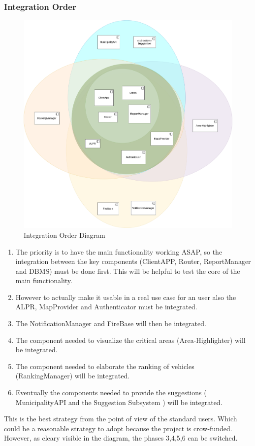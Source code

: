 \documentclass{article}
\begin{document}
\subsubsection{Integration Order}
		\begin{figure}[!htb]
			\centering
			\includegraphics[width=1.0\textwidth]{images/component-integration.png}
			\caption{Integration Order Diagram}
		\end{figure}
\begin{enumerate}
	\item 	The priority is to have the main functionality working ASAP, so the integration between the key components (ClientAPP, Router, ReportManager and DBMS) must be done first. 
		This will be helpful to test the core of the main functionality. 
	\item 	However to actually make it usable in a real use case for an user also the ALPR, MapProvider and Authenticator must be integrated.
	\item 	The NotificationManager and FireBase will then be integrated. 
	\item   The component needed to visualize the critical areas (Area-Highlighter) will be integrated.
	\item   The component needed to elaborate the ranking of vehicles (RankingManager) will be integrated.
	\item   Eventually the components needed to provide the suggestions ( MunicipalityAPI and the Suggestion Subsystem ) will be integrated.
\end{enumerate}
This is the best strategy from the point of view of the standard users.
Which could be a reasonable strategy to adopt because the project is crow-funded.
However, as cleary visible in the diagram, the phases 3,4,5,6 can be switched. 
\end{document}

